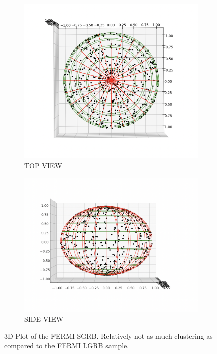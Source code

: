 \documentclass[12pt]{article}
\begin{document}
\begin{figure}[h]
  \begin{subfigure}{.5\textwidth}
  \centering
    \includegraphics[width=1\linewidth]{FERMI SGRB 3D.png}
    \caption{TOP VIEW}
  \end{subfigure}%
  \begin{subfigure}{.5\textwidth}
  \centering
    \includegraphics[width=1\linewidth]{FERMI SGRB 3DD.png}
    \caption{SIDE VIEW}
  \end{subfigure}
  \caption{3D Plot of the FERMI SGRB. Relatively not as much clustering as compared to the FERMI LGRB sample.}
\end{figure}
\end{document}
